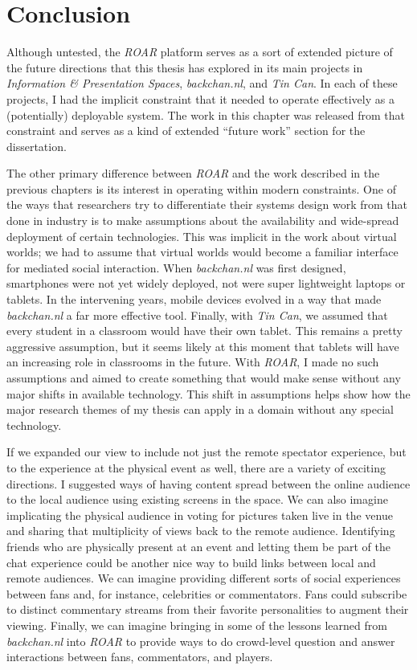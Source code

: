 \section{Conclusion}

Although untested, the \emph{ROAR} platform serves as a sort of extended picture of the future directions that this thesis has explored in its main projects in \emph{Information \& Presentation Spaces}, \emph{backchan.nl}, and \emph{Tin Can}. In each of these projects, I had the implicit constraint that it needed to operate effectively as a (potentially) deployable system. The work in this chapter was released from that constraint and serves as a kind of extended ``future work'' section for the dissertation.

The other primary difference between \emph{ROAR} and the work described in the previous chapters is its interest in operating within modern constraints. One of the ways that researchers try to differentiate their systems design work from that done in industry is to make assumptions about the availability and wide-spread deployment of certain technologies. This was implicit in the work about virtual worlds; we had to assume that virtual worlds would become a familiar interface for mediated social interaction. When \emph{backchan.nl} was first designed, smartphones were not yet widely deployed, not were super lightweight laptops or tablets. In the intervening years, mobile devices evolved in a way that made \emph{backchan.nl} a far more effective tool. Finally, with \emph{Tin Can}, we assumed that every student in a classroom would have their own tablet. This remains a pretty aggressive assumption, but it seems likely at this moment that tablets will have an increasing role in classrooms in the future. With \emph{ROAR}, I made no such assumptions and aimed to create something that would make sense without any major shifts in available technology. This shift in assumptions helps show how the major research themes of my thesis can apply in a domain without any special technology.

If we expanded our view to include not just the remote spectator experience, but to the experience at the physical event as well, there are a variety of exciting directions. I suggested ways of having content spread between the online audience to the local audience using existing screens in the space. We can also imagine implicating the physical audience in voting for pictures taken live in the venue and sharing that multiplicity of views back to the remote audience. Identifying friends who are physically present at an event and letting them be part of the chat experience could be another nice way to build links between local and remote audiences. We can imagine providing different sorts of social experiences between fans and, for instance, celebrities or commentators. Fans could subscribe to distinct  commentary streams from their favorite personalities to augment their viewing. Finally, we can imagine bringing in some of the lessons learned from \emph{backchan.nl}  into \emph{ROAR} to provide ways to do crowd-level question and answer interactions between fans, commentators, and players. 


